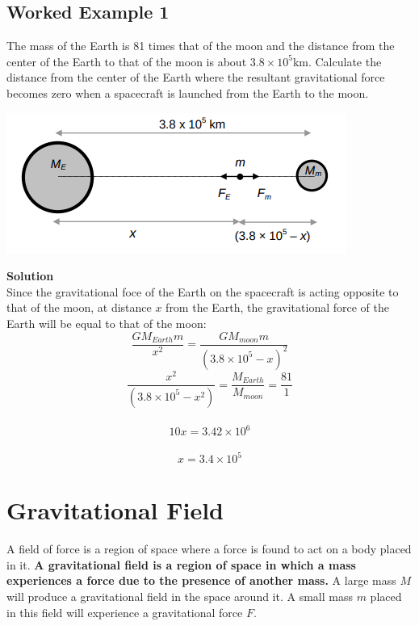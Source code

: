 \documentclass{article}
\begin{document}
\subsection*{Worked Example 1}
The mass of the Earth is 81 times that of the moon and the distance from the center of the Earth to that of the moon is about $3.8\times10^5$km.
Calculate the distance from the center of the Earth where the resultant gravitational force becomes zero when a spacecraft is launched from the Earth to the moon.
\begin{center}
    \includegraphics[scale=0.6]{assets/sec1ex1.png}
\end{center}\leavevmode
\textbf{Solution}
\\Since the gravitational foce of the Earth on the spacecraft is acting opposite to that of the moon, at distance $x$ from the Earth,
the gravitational force of the Earth will be equal to that of the moon:
\\
\begin{equation}
    \frac{GM_{Earth}m}{x^2}=\frac{GM_{moon}m}{(3.8\times10^5-x)^2}
\end{equation}
\begin{equation}
    \frac{x^2}{(3.8\times10^5-x^2)}=\frac{M_{Earth}}{M_{moon}}=\frac{81}{1}
\end{equation}
\\
\begin{equation}
    10x=3.42\times10^6
\end{equation}
\\
\begin{equation}
    x=3.4\times10^5
\end{equation}
\pagebreak
\section{Gravitational Field}
A field of force is a region of space where a force is found to act on a body placed in it. \textbf{A gravitational field is a region of space in which a mass experiences a force due to the presence of another mass.}
A large mass $M$ will produce a gravitational field in the space around it. A small mass $m$ placed in this field will experience a gravitational force $F$.
\end{document}
